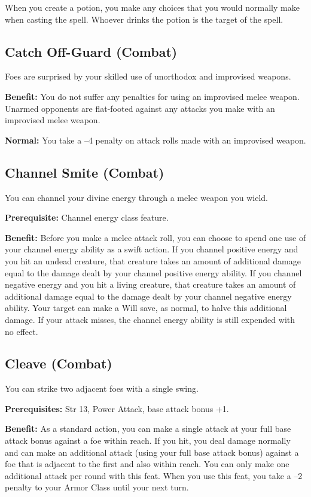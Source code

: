 When you create a potion, you make any choices that you would normally make when casting the spell. Whoever drinks the potion is the target of the spell.
				
\subsection{Catch Off-Guard (Combat)}

				
Foes are surprised by your skilled use of unorthodox and improvised weapons.
				
\textbf{Benefit:} You do not suffer any penalties for using an improvised melee weapon. Unarmed opponents are flat-footed against any attacks you make with an improvised melee weapon.
				
\textbf{Normal:} You take a --4 penalty on attack rolls made with an improvised weapon.
				
\subsection{Channel Smite (Combat)}

				
You can channel your divine energy through a melee weapon you wield.
				
\textbf{Prerequisite:} Channel energy class feature.
				
\textbf{Benefit:} Before you make a melee attack roll, you can choose to spend one use of your channel energy ability as a swift action. If you channel positive energy and you hit an undead creature, that creature takes an amount of additional damage equal to the damage dealt by your channel positive energy ability. If you channel negative energy and you hit a living creature, that creature takes an amount of additional damage equal to the damage dealt by your channel negative energy ability. Your target can make a Will save, as normal, to halve this additional damage. If your attack misses, the channel energy ability is still expended with no effect.
				
\subsection{Cleave (Combat)}

				
You can strike two adjacent foes with a single swing.
				
\textbf{Prerequisites:} Str 13, Power Attack, base attack bonus +1.
				
\textbf{Benefit:} As a standard action, you can make a single attack at your full base attack bonus against a foe within reach. If you hit, you deal damage normally and can make an additional attack (using your full base attack bonus) against a foe that is adjacent to the first and also within reach. You can only make one additional attack per round with this feat. When you use this feat, you take a --2 penalty to your Armor Class until your next turn.
				
